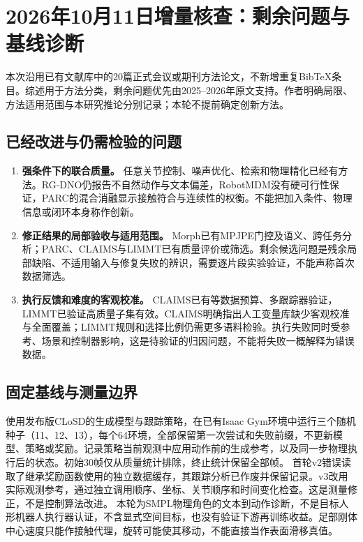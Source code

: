 \section{2026年10月11日增量核查：剩余问题与基线诊断}
本次沿用已有文献库中的20篇正式会议或期刊方法论文，不新增重复BibTeX条目。综述用于方法分类，剩余问题优先由2025--2026年原文支持。作者明确局限、方法适用范围与本研究推论分别记录；本轮不提前确定创新方法。
\subsection{已经改进与仍需检验的问题}
\begin{enumerate}
\item \textbf{强条件下的联合质量。} 任意关节控制、噪声优化、检索和物理精化已经有方法。RG-DNO仍报告不自然动作与文本偏差，RobotMDM没有硬可行性保证，PARC的混合消融显示接触符合与连续性的权衡。不能把加入条件、物理信息或闭环本身称作创新。\citep{rgdno,robotmdm,parc}
\item \textbf{修正结果的局部验收与适用范围。} Morph已有MPJPE门控及语义、跨任务分析；PARC、CLAIMS与LIMMT已有质量评价或筛选。剩余候选问题是残余局部缺陷、不适用输入与修复失败的辨识，需要逐片段实验验证，不能声称首次数据筛选。\citep{morph,parc,claims,limmt}
\item \textbf{执行反馈和难度的客观校准。} CLAIMS已有等数据预算、多跟踪器验证，LIMMT已验证高质量子集有效。CLAIMS明确指出人工变量库缺少客观校准与全面覆盖；LIMMT规则和选择比例仍需更多语料检验。执行失败同时受参考、场景和控制器影响，这是待验证的归因问题，不能将失败一概解释为错误数据。\citep{claims,limmt}
\end{enumerate}
\subsection{固定基线与测量边界}
使用发布版CLoSD的生成模型与跟踪策略，在已有Isaac Gym环境中运行三个随机种子（11、12、13），每个64环境，全部保留第一次尝试和失败前缀，不更新模型、策略或奖励。记录策略当前观测中应用动作前的生成参考，以及同一步物理执行后的状态。初始30帧仅从质量统计排除，终止统计保留全部帧。\citep{closd}
首轮v2错误读取了继承奖励函数使用的独立数据缓存，其跟踪分析已作废并保留记录。v3改用实际观测参考，通过独立调用顺序、坐标、关节顺序和时间变化检查。这是测量修正，不是控制算法改进。
本轮为SMPL物理角色的文本到动作诊断，不是目标人形机器人执行器认证，不含显式空间目标，也没有验证下游再训练收益。足部刚体中心速度只能作接触代理，旋转可能使其移动，不能直接当作表面滑移真值。
